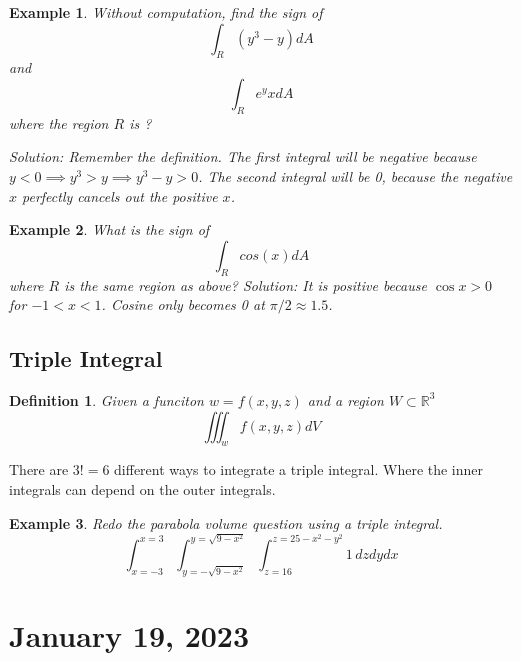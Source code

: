 \documentclass[11pt]{article}
\newtheorem{defn}{Definition}
\newtheorem{ex}{Example}
\begin{document}
\begin{ex}
Without computation, find the sign of
\[\int_R (y^3-y) dA\]
and
\[\int_R e^yx dA\]
where
the region $R$
is
?

Solution:
Remember the definition. The first integral will be negative because
$y < 0 \implies y^3 > y \implies y^3 - y > 0$.
The second integral will be 0, because the negative $x$ perfectly cancels out the positive $x$.

\end{ex}

\begin{ex}
 What is the sign of
 \[\int_R cos(x) dA\]
 where $R$ is the same region as above?
 Solution: It is positive because $\cos{x} > 0$ for $-1 < x < 1$. Cosine only becomes 0 at $\pi/2 \approx 1.5$.
\end{ex}


\subsection{Triple Integral}
\begin{defn}
  Given a funciton $w = f(x,y,z)$ and a region $W \subset \mathbb{R}^3$
  \[\iiint_w f(x,y,z) dV\]
\end{defn}
There are $3! = 6$ different ways to integrate a triple integral. Where the inner integrals can depend on
the outer integrals.

\begin{ex}
  Redo the parabola volume question using a triple integral.
  \[\int_{x=-3}^{x=3} \int_{y=-\sqrt{9-x^2}}^{y=\sqrt{9-x^2}} \int_{z=16}^{z=25-x^2-y^2} 1 \, dz dy dx\]
\end{ex}


\section{January 19, 2023}
\end{document}
